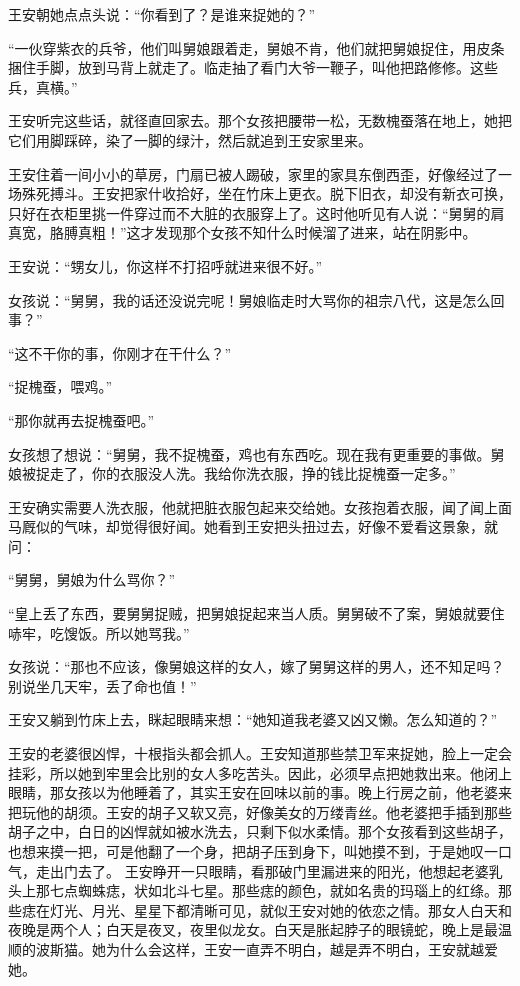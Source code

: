 王安朝她点点头说：“你看到了？是谁来捉她的？” 

“一伙穿紫衣的兵爷，他们叫舅娘跟着走，舅娘不肯，他们就把舅娘捉住，用皮条捆住手脚，放到马背上就走了。临走抽了看门大爷一鞭子，叫他把路修修。这些兵，真横。” 

王安听完这些话，就径直回家去。那个女孩把腰带一松，无数槐蚕落在地上，她把它们用脚踩碎，染了一脚的绿汁，然后就追到王安家里来。 

王安住着一间小小的草房，门扇已被人踢破，家里的家具东倒西歪，好像经过了一场殊死搏斗。王安把家什收拾好，坐在竹床上更衣。脱下旧衣，却没有新衣可换，只好在衣柜里挑一件穿过而不大脏的衣服穿上了。这时他听见有人说：“舅舅的肩真宽，胳膊真粗！”这才发现那个女孩不知什么时候溜了进来，站在阴影中。 

王安说：“甥女儿，你这样不打招呼就进来很不好。” 

女孩说：“舅舅，我的话还没说完呢！舅娘临走时大骂你的祖宗八代，这是怎么回事？” 

“这不干你的事，你刚才在干什么？” 

“捉槐蚕，喂鸡。” 

“那你就再去捉槐蚕吧。” 

女孩想了想说：“舅舅，我不捉槐蚕，鸡也有东西吃。现在我有更重要的事做。舅娘被捉走了，你的衣服没人洗。我给你洗衣服，挣的钱比捉槐蚕一定多。” 

王安确实需要人洗衣服，他就把脏衣服包起来交给她。女孩抱着衣服，闻了闻上面马厩似的气味，却觉得很好闻。她看到王安把头扭过去，好像不爱看这景象，就问： 

“舅舅，舅娘为什么骂你？” 

“皇上丢了东西，要舅舅捉贼，把舅娘捉起来当人质。舅舅破不了案，舅娘就要住哧牢，吃馊饭。所以她骂我。” 

女孩说：“那也不应该，像舅娘这样的女人，嫁了舅舅这样的男人，还不知足吗？别说坐几天牢，丢了命也值！” 

王安又躺到竹床上去，眯起眼睛来想：“她知道我老婆又凶又懒。怎么知道的？” 

王安的老婆很凶悍，十根指头都会抓人。王安知道那些禁卫军来捉她，脸上一定会挂彩，所以她到牢里会比别的女人多吃苦头。因此，必须早点把她救出来。他闭上眼睛，那女孩以为他睡着了，其实王安在回味以前的事。晚上行房之前，他老婆来把玩他的胡须。王安的胡子又软又亮，好像美女的万缕青丝。他老婆把手插到那些胡子之中，白日的凶悍就如被水洗去，只剩下似水柔情。那个女孩看到这些胡子，也想来摸一把，可是他翻了一个身，把胡子压到身下，叫她摸不到，于是她叹一口气，走出门去了。 王安睁开一只眼睛，看那破门里漏进来的阳光，他想起老婆乳头上那七点蜘蛛痣，状如北斗七星。那些痣的颜色，就如名贵的玛瑙上的红绦。那些痣在灯光、月光、星星下都清晰可见，就似王安对她的依恋之情。那女人白天和夜晚是两个人；白天是夜叉，夜里似龙女。白天是胀起脖子的眼镜蛇，晚上是最温顺的波斯猫。她为什么会这样，王安一直弄不明白，越是弄不明白，王安就越爱她。 

